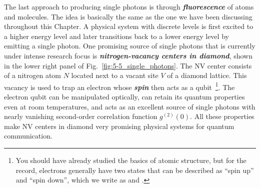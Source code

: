 The last approach to producing single photons is through \textit{\textbf{fluorescence}} of atoms and molecules.
The idea is basically the same as the one we have been discussing throughout this Chapter.
A physical system with discrete levels is first excited to a higher energy level and later transitions back to a lower energy level by emitting a single photon.
One promising source of single photons that is currently under intense research focus is \textbf{\emph{nitrogen-vacancy centers in diamond}}, shown in the lower right panel of Fig.~\ref{fig:5-5_single_photons}.
The NV center consists of a nitrogen atom $N$ located next to a vacant site $V$ of a diamond lattice.
This vacancy is used to trap an electron whose \textbf{\emph{spin}} then acts as a qubit~\footnote{You should have already studied the basics of atomic structure, but for the record, electrons generally have two states that can be described as ``spin up'' and ``spin down'', which we write as \ket{\uparrow} and \ket{\downarrow}.}.
The electron qubit can be manipulated optically, can retain its quantum properties even at room temperatures, and acts as an excellent source of single photons with nearly vanishing second-order correlation function $g^{(2)}(0)$.
All these properties make NV centers in diamond very promising physical systems for quantum communication.


